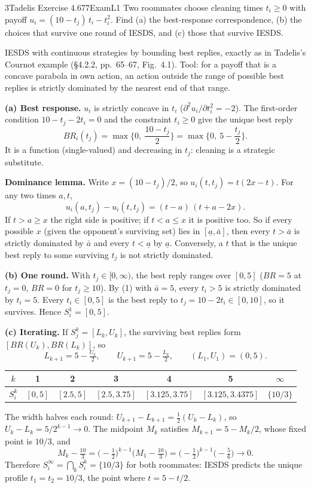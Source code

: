 \begin{exsol}{3}{Tadelis Exercise 4.6}{77}{Exam}{L1}
\asked Two roommates choose cleaning times $t_i \ge 0$ with payoff
$u_i = (10 - t_j)\,t_i - t_i^2$. Find (a) the best-response correspondence, (b) the choices that
survive one round of IESDS, and (c) those that survive IESDS.

\method IESDS with continuous strategies by bounding best replies, exactly as in Tadelis's
Cournot example (\S4.2.2, pp.~65--67, Fig.~4.1). Tool: for a payoff that is a concave parabola
in own action, an action outside the range of possible best replies is strictly dominated by the
nearest end of that range.

\solution
\textbf{(a) Best response.} $u_i$ is strictly concave in $t_i$ ($\partial^2 u_i/\partial t_i^2 = -2$).
The first-order condition $10 - t_j - 2t_i = 0$ and the constraint $t_i \ge 0$ give the unique
best reply
\[
  BR_i(t_j) = \max\Big\{0,\ \frac{10 - t_j}{2}\Big\} = \max\Big\{0,\ 5 - \frac{t_j}{2}\Big\}.
\]
It is a function (single-valued) and decreasing in $t_j$: cleaning is a strategic substitute.

\textbf{Dominance lemma.} Write $x = (10 - t_j)/2$, so $u_i(t, t_j) = t(2x - t)$. For any two
times $a, t$,
\[
  u_i(a, t_j) - u_i(t, t_j) = (t - a)\,(t + a - 2x). \tag{1}
\]
If $t > a \ge x$ the right side is positive; if $t < a \le x$ it is positive too. So if every
possible $x$ (given the opponent's surviving set) lies in $[\underline{a}, \bar a]$, then every
$t > \bar a$ is strictly dominated by $\bar a$ and every $t < \underline{a}$ by $\underline{a}$.
Conversely, a $t$ that is the unique best reply to some surviving $t_j$ is not strictly
dominated.

\textbf{(b) One round.} With $t_j \in [0, \infty)$, the best reply ranges over $[0, 5]$
($BR = 5$ at $t_j = 0$, $BR = 0$ for $t_j \ge 10$). By (1) with $\bar a = 5$, every $t_i > 5$
is strictly dominated by $t_i = 5$. Every $t_i \in [0,5]$ is the best reply to
$t_j = 10 - 2t_i \in [0, 10]$, so it survives. Hence $S_i^1 = [0, 5]$.

\textbf{(c) Iterating.} If $S_j^k = [L_k, U_k]$, the surviving best replies form
$[BR(U_k), BR(L_k)]$, so
\[
  L_{k+1} = 5 - \tfrac{U_k}{2}, \qquad U_{k+1} = 5 - \tfrac{L_k}{2}, \qquad (L_1, U_1) = (0, 5).
\]
\begin{center}
\begin{tabular}{c|cccccc}
$k$ & 1 & 2 & 3 & 4 & 5 & $\infty$ \\ \hline
$S_i^k$ & $[0, 5]$ & $[2.5, 5]$ & $[2.5, 3.75]$ & $[3.125, 3.75]$ & $[3.125, 3.4375]$ & $\{10/3\}$
\end{tabular}
\end{center}
The width halves each round: $U_{k+1} - L_{k+1} = \tfrac12 (U_k - L_k)$, so
$U_k - L_k = 5/2^{k-1} \to 0$. The midpoint $M_k$ satisfies $M_{k+1} = 5 - M_k/2$, whose fixed
point is $10/3$, and
\[
  M_k - \tfrac{10}{3} = \big(-\tfrac12\big)^{k-1}\big(M_1 - \tfrac{10}{3}\big)
  = \big(-\tfrac12\big)^{k-1}\big(-\tfrac56\big) \to 0 .
\]
Therefore $S_i^\infty = \bigcap_k S_i^k = \{10/3\}$ for both roommates: IESDS predicts the
unique profile $t_1 = t_2 = 10/3$, the point where $t = 5 - t/2$.


\end{exsol}
